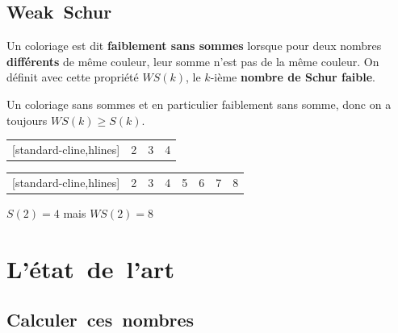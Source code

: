 \documentclass[graphics]{beamer}
\begin{document}
\subsection{Weak~Schur}

\begin{frame}
	\begin{tcolorbox}[colback=red!5,colframe=red!40!black,title=Définition]
		Un coloriage est dit \textbf{faiblement sans sommes} lorsque pour deux nombres \textbf{différents} de même couleur,
		leur somme n'est pas de la même couleur. On définit avec cette propriété \(WS(k)\), le \(k\)-ième 
		\textbf{nombre de Schur faible}.
	\end{tcolorbox}
	\pause
	Un coloriage sans sommes et en particulier faiblement sans somme, donc on a toujours \(WS(k) \geq S(k)\).\\
	\pause 
	\begin{center}
	\begin{NiceTabular}{|*{4}{c|}}[standard-cline,hlines]
		\CodeBefore
		 & 2 & 3 & 4 \\
	\end{NiceTabular}

	\begin{NiceTabular}{|*{8}{c|}}[standard-cline,hlines]
		\CodeBefore
		 & 2 & 3 & 4 & 5 & 6 & 7 & 8 \\
	\end{NiceTabular}
	\end{center}
	\(S(2) = 4\) mais \(WS(2) = 8\)
\end{frame}

\section{L'état~de~l'art}
\subsection{Calculer~ces~nombres}
\end{document}

